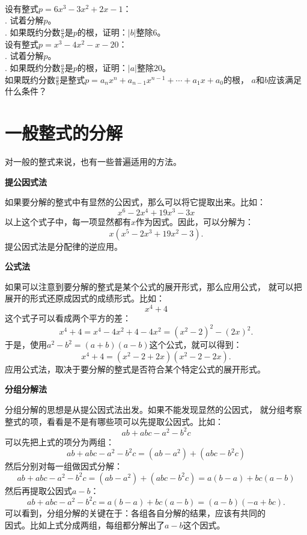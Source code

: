 \documentclass[12pt,UTF8,fontset=none]{ctexbook}
\begin{document}
\begin{xt}\label{xt:2-1-0}
    \mbox{}\\
    设有整式$p = 6x^3 - 3x^2 + 2x - 1$：\\
    . 试着分解$p$。\\
    . 如果既约分数$\frac{a}{b}$是$p$的根，证明：$|b|$整除$6$。\\
    设有整式$p = x^3 - 4x^2 - x - 20 $：\\
    . 试着分解$p$。\\
    . 如果既约分数$\frac{a}{b}$是$p$的根，证明：$|a|$整除$20$。\\
    如果既约分数$\frac{a}{b}$是整式$p = a_nx^n + a_{n-1}x^{n-1} + \cdots + a_1 x + a_0$的根，
    $a$和$b$应该满足什么条件？
\end{xt}

\section{一般整式的分解}
对一般的整式来说，也有一些普遍适用的方法。

\noindent \textbf{提公因式法}

\indent 如果要分解的整式中有显然的公因式，那么可以将它提取出来。比如：
$$ x^6 - 2x^4 + 19 x^3 -3x$$
\indent 以上这个式子中，每一项显然都有$x$作为因式。因此，可以分解为：
$$ x(x^5 - 2x^3 + 19x^2 - 3).$$
\indent 提公因式法是分配律的逆应用。

\noindent \textbf{公式法}

\indent 如果可以注意到要分解的整式是某个公式的展开形式，那么应用公式，
\indent 就可以把展开的形式还原成因式的成绩形式。比如： 
$$x^4 + 4$$
\indent 这个式子可以看成两个平方的差：
$$ x^4 + 4 = x^4 - 4x^2 + 4 - 4x^2 = (x^2 - 2)^2- (2x)^2.$$
\indent 于是，使用$a^2 - b^2 = (a + b)(a - b)$这个公式，就可以得到：
$$x^4 + 4 = (x^2 - 2 + 2x)(x^2 -2 -2x).$$
\indent 应用公式法，取决于要分解的整式是否符合某个特定公式的展开形式。

\noindent \textbf{分组分解法}

\indent 分组分解的思想是从提公因式法出发。如果不能发现显然的公因式，
\indent 就分组考察整式的项，看看是不是有哪些项可以先提取公因式。比如：
$$ ab + abc - a^2 - b^2c$$
\indent 可以先把上式的项分为两组：
$$ ab + abc - a^2 - b^2c = (ab - a^2) + (abc - b^2c)$$
\indent 然后分别对每一组做因式分解：
$$ ab + abc - a^2 - b^2c = (ab - a^2) + (abc - b^2c) = a(b - a) + bc(a - b)$$
\indent 然后再提取公因式$a - b$：
$$ ab + abc - a^2 - b^2c = a(b - a) + bc(a - b) = (a - b)(-a + bc).$$
\indent 可以看到，分组分解的关键在于：各组各自分解的结果，应该有共同的\\
\indent 因式。比如上式分成两组，每组都分解出了$a - b$这个因式。
\end{document}
